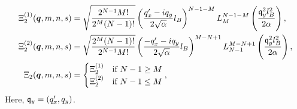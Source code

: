 \begin{align}
  \Xi_2 ^{(1)}(\bm{q}, m, n, s) &= \sqrt{\frac{2^{N-1} M!}{2^M (N-1)!}}
                                   \left( \frac{q'_x - iq_y}{2 \sqrt{\alpha }} l_B \right)^{N-1 - M}
                                   L^{N-1 -M}_{M} \left( \frac{\mathfrak{q}_y^2 l_B^2}{2 \alpha } \right),\\
  \Xi_2 ^{(2)}(\bm{q}, m, n, s) &= \sqrt{\frac{2^M (N-1)!}{2^{N-1} M!}}
                                   \left( \frac{-q'_x - iq_y}{2 \sqrt{\alpha }} l_B \right)^{M-N + 1}
                                   L^{M - N + 1}_{N-1} \left( \frac{\mathfrak{q}_y^2 l_B^2}{2 \alpha } \right),\\
  \Xi_2(\bm{q}, m, n, s) &=
          \begin{cases}
            \Xi _2 ^{(1)} & \text{if } N-1 \geq M\\
            \Xi _2 ^{(2)} & \text{if } N-1 \leq M
          \end{cases}, \label{eq:43}
\end{align}
Here, \( \mathfrak{q}_y = (q'_x, q_y) \).


